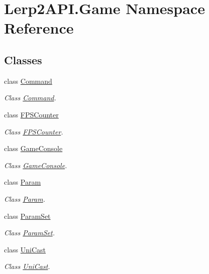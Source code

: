 \hypertarget{namespace_lerp2_a_p_i_1_1_game}{}\section{Lerp2\+A\+P\+I.\+Game Namespace Reference}
\label{namespace_lerp2_a_p_i_1_1_game}
\subsection*{Classes}
\begin{DoxyCompactItemize}
\item 
class \hyperlink{class_lerp2_a_p_i_1_1_game_1_1_command}{Command}
\begin{DoxyCompactList}\small\item\em Class \hyperlink{class_lerp2_a_p_i_1_1_game_1_1_command}{Command}. \end{DoxyCompactList}\item 
class \hyperlink{class_lerp2_a_p_i_1_1_game_1_1_f_p_s_counter}{F\+P\+S\+Counter}
\begin{DoxyCompactList}\small\item\em Class \hyperlink{class_lerp2_a_p_i_1_1_game_1_1_f_p_s_counter}{F\+P\+S\+Counter}. \end{DoxyCompactList}\item 
class \hyperlink{class_lerp2_a_p_i_1_1_game_1_1_game_console}{Game\+Console}
\begin{DoxyCompactList}\small\item\em Class \hyperlink{class_lerp2_a_p_i_1_1_game_1_1_game_console}{Game\+Console}. \end{DoxyCompactList}\item 
class \hyperlink{class_lerp2_a_p_i_1_1_game_1_1_param}{Param}
\begin{DoxyCompactList}\small\item\em Class \hyperlink{class_lerp2_a_p_i_1_1_game_1_1_param}{Param}. \end{DoxyCompactList}\item 
class \hyperlink{class_lerp2_a_p_i_1_1_game_1_1_param_set}{Param\+Set}
\begin{DoxyCompactList}\small\item\em Class \hyperlink{class_lerp2_a_p_i_1_1_game_1_1_param_set}{Param\+Set}. \end{DoxyCompactList}\item 
class \hyperlink{class_lerp2_a_p_i_1_1_game_1_1_uni_cast}{Uni\+Cast}
\begin{DoxyCompactList}\small\item\em Class \hyperlink{class_lerp2_a_p_i_1_1_game_1_1_uni_cast}{Uni\+Cast}. \end{DoxyCompactList}\end{DoxyCompactItemize}

